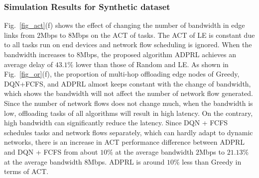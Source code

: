 \documentclass[10pt, conference, letterpaper]{IEEEtran}
\begin{document}

\subsubsection{Simulation Results for Synthetic dataset}

Fig.~\ref{fig_act}(f) shows the effect of changing the number of bandwidth in edge links from $2$Mbps to $8$Mbps on the ACT of tasks.  The ACT of LE is constant due to all tasks run on end devices and network flow scheduling is ignored. When the bandwidth increases to $8$Mbps, the proposed algorithm ADPRL achieves an average delay of $43.1\%$ lower than those of Random and LE. As shown in Fig.~\ref{fig_or}(f), the proportion of multi-hop offloading edge nodes of Greedy, DQN+FCFS, and ADPRL almost keeps constant with the change of bandwidth, which shows the bandwidth will not affect the number of network flow generated. Since the number of network flows does not change much, when the bandwidth is low, offloading tasks of all algorithms will result in high latency. On the contrary, high bandwidth can significantly reduce the latency. Since DQN + FCFS schedules tasks and network flows separately, which can hardly adapt to dynamic networks, there is an increase in ACT performance difference between ADPRL and DQN + FCFS from about $10\%$ at the average bandwidth $2$Mbps to $21.13\%$ at the average bandwidth $8$Mbps. ADPRL is around $10\%$ less than Greedy in terms of ACT. 

\end{document}
